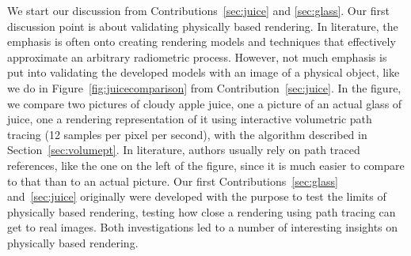 We start our discussion from Contributions~\ref{sec:juice} and \ref{sec:glass}. Our first discussion point is about validating physically based rendering. In literature, the emphasis is often onto creating rendering models and techniques that effectively approximate an arbitrary radiometric process. However, not much emphasis is put into validating the developed models with an image of a physical object, like we do in Figure~\ref{fig:juicecomparison} from Contribution~\ref{sec:juice}. In the figure, we compare two pictures of cloudy apple juice, one a picture of an actual glass of juice, one a rendering representation of it using interactive volumetric path tracing (12 samples per pixel per second), with the algorithm described in Section~\ref{sec:volumept}. In literature, authors usually rely on path traced references, like the one on the left of the figure, since it is much easier to compare to that than to an actual picture. Our first Contributions~\ref{sec:glass} and~\ref{sec:juice} originally were developed with the purpose to test the limits of physically based rendering, testing how close a rendering using path tracing can get to real images. Both investigations led to a number of interesting insights on physically based rendering.

